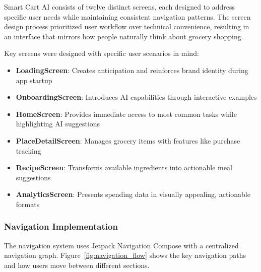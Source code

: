 \documentclass[11pt,a4paper]{article}
\begin{document}
Smart Cart AI consists of twelve distinct screens, each designed to address specific user needs while maintaining consistent navigation patterns. The screen design process prioritized user workflow over technical convenience, resulting in an interface that mirrors how people naturally think about grocery shopping.

Key screens were designed with specific user scenarios in mind:

\begin{itemize}
    \item \textbf{LoadingScreen}: Creates anticipation and reinforces brand identity during app startup
    \item \textbf{OnboardingScreen}: Introduces AI capabilities through interactive examples
    \item \textbf{HomeScreen}: Provides immediate access to most common tasks while highlighting AI suggestions
    \item \textbf{PlaceDetailScreen}: Manages grocery items with features like purchase tracking
    \item \textbf{RecipeScreen}: Transforms available ingredients into actionable meal suggestions
    \item \textbf{AnalyticsScreen}: Presents spending data in visually appealing, actionable formats
\end{itemize}

\subsubsection{Navigation Implementation}

The navigation system uses Jetpack Navigation Compose with a centralized navigation graph. Figure~\ref{fig:navigation_flow} shows the key navigation paths and how users move between different sections.
\end{document}
